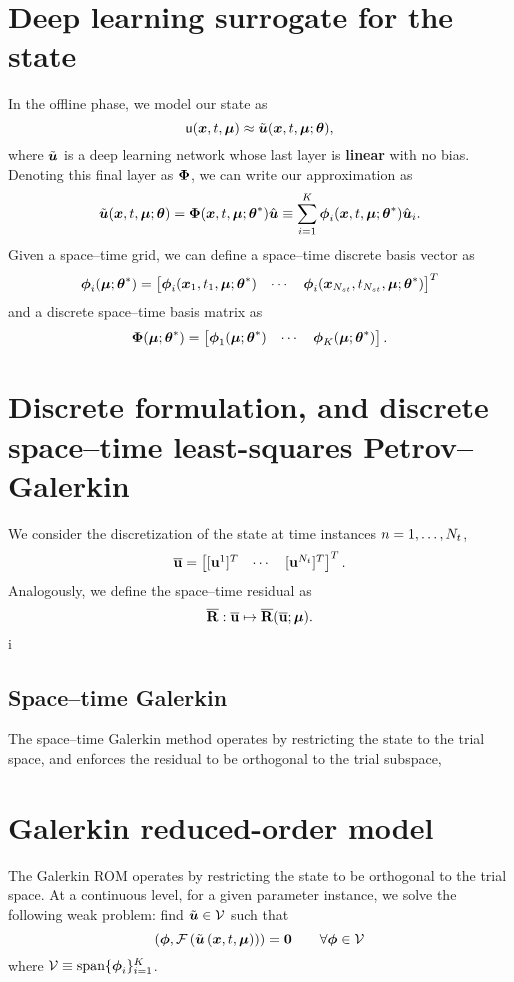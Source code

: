 \documentclass[3p,computermodern,10pt]{elsarticle}
\begin{document}
\section{Deep learning surrogate for the state}
In the offline phase, we model our state as
$$\mathsf{u}(\boldsymbol x, t,\boldsymbol \mu) \approx \tilde{\boldsymbol u}(\boldsymbol x, t,\boldsymbol \mu;\boldsymbol \theta),$$
where $\tilde{\boldsymbol u}$ is a deep learning network whose last layer is \textbf{linear} with no bias. Denoting this final layer as $\boldsymbol \Phi$, we can write our approximation as
$$\tilde{\boldsymbol u}(\boldsymbol x, t,\boldsymbol \mu;\boldsymbol \theta) = \boldsymbol \Phi (\boldsymbol x, t,\boldsymbol \mu;\boldsymbol \theta^*)\hat{\boldsymbol u} \equiv \sum_{i=1}^{K} \boldsymbol \phi_i(\boldsymbol x, t,\boldsymbol \mu;\boldsymbol \theta^*) \hat{\boldsymbol u}_i.$$
Given a space--time grid, we can define a space--time discrete basis vector as
$$\mathbf{\boldsymbol \phi}_i(\boldsymbol \mu;\boldsymbol \theta^*) = \begin{bmatrix} 
\boldsymbol \phi_i(\boldsymbol x_1,t_1,\boldsymbol \mu;\boldsymbol \theta^*) & \cdots & \boldsymbol \phi_i(\boldsymbol x_{N_{st}},t_{N_{st}},\boldsymbol \mu;\boldsymbol \theta^*)
\end{bmatrix}^T$$
and a discrete space--time basis matrix as
$$\mathbf{\Phi}(\boldsymbol \mu;\boldsymbol \theta^*) = \begin{bmatrix} \mathbf{\boldsymbol \phi}_1(\boldsymbol \mu;\boldsymbol \theta^*) & \cdots & \mathbf{\boldsymbol \phi}_{K}(\boldsymbol \mu;\boldsymbol \theta^*) \end{bmatrix}.$$
\section{Discrete formulation, and discrete space--time least-squares Petrov--Galerkin}
We consider the discretization of the state at time instances $n=1,\ldots,N_t$,
$$\overline{\mathbf{u}} = \begin{bmatrix} [\mathbf{u}^1]^T & \cdots & [\mathbf{u}^{N_t}]^T \end{bmatrix}^T.$$
Analogously, we define the space--time residual as
$$\overline{\mathbf{R}}: \overline{\mathbf{u}} \mapsto \overline{\mathbf{R}}(\overline{\mathbf{u}};\boldsymbol \mu).$$i
\subsection{Space--time Galerkin}
The space--time Galerkin method operates by restricting the state to the trial space, and enforces the residual to be orthogonal to the trial subspace,


\section{Galerkin reduced-order model}
The Galerkin ROM operates by restricting the state to be orthogonal to the trial space. At a continuous level, for a given parameter instance, we solve the following weak problem: find $\tilde{\boldsymbol u} \in \mathcal{V}$ such that
$$\left( \boldsymbol \phi, \mathcal{F}\left(\tilde{\boldsymbol u}\left(\boldsymbol x, t,\boldsymbol \mu\right)\right) \right) = \boldsymbol 0 \qquad \forall \boldsymbol \phi \in \mathcal{V}$$
where $\mathcal{V} \equiv \text{span}\{ \boldsymbol \phi_i\}_{i=1}^{K}$.
\end{document}
